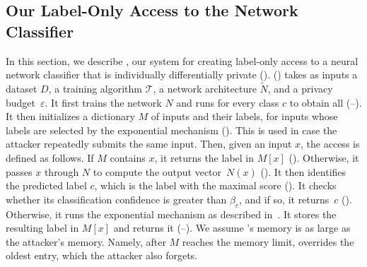 \subsection{Our \propi Label-Only Access to the Network Classifier} 
In this section, we describe \reptool, our system for creating label-only access to a neural network classifier that is individually differentially private (\propi).
\reptool () takes as inputs a dataset $D$, a training algorithm $\mathcal{T}$, a network architecture $\widetilde{N}$, and a privacy budget~$\varepsilon$.
It first trains the network $N$ and runs \boundtool for every class $c$ to obtain all \propa (--). 
It then initializes a dictionary $M$ of inputs and their labels, for inputs whose labels are selected by the exponential mechanism (). This is used in case the attacker repeatedly submits the same input. 
Then, given an input $x$, the \propi access is defined as follows.  
If $M$ contains $x$, it returns the label in $M[x]$ ().
Otherwise, it passes $x$ through $N$ to compute the output vector~$N(x)$ (). It then identifies the predicted label $c$, which is the label with the maximal score (). 
It checks whether its classification confidence is greater than $\beta_{c}$, and if so, it returns~$c$ (). 
Otherwise, it runs the exponential mechanism as described in~. %
 It stores the resulting label in $M[x]$ and returns it (--). %
We assume \reptool's memory is as large as the attacker's memory. Namely, after $M$ reaches the memory limit, \reptool overrides the oldest entry, which the attacker also forgets.



